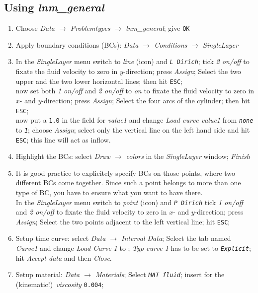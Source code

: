 \subsection{Using \emph{lnm\_general}}
\begin{enumerate}
\item Choose \emph{Data $\rightarrow$ Problemtypes $\rightarrow$ lnm\_general};
give \texttt{OK}
\item Apply boundary conditions (BCs): \emph{Data $\rightarrow$ Conditions
$\rightarrow$ SingleLayer}
\item In the \emph{SingleLayer} menu switch to \emph{line} (icon) and 
\texttt{\emph{L Dirich}}; 
tick \emph{2 on/off} to fixate the fluid velocity
to zero in $y$-direction; press \emph{Assign}; 
Select the two upper and the two lower horizontal lines; 
 then hit \texttt{ESC};\\
now set both \emph{1
on/off} and \emph{2 on/off} to \emph{on} to fixate the fluid velocity
to zero in $x$- and $y$-direction; press \emph{Assign}; 
Select the four arcs of the cylinder; 
 then hit \texttt{ESC};\\
now put a \texttt{1.0} in the field for \emph{value1} and change \emph{Load curve value1} from \emph{\texttt{none}} to \emph{\texttt{1}};
choose \emph{Assign}; select only the vertical line on the left hand side and hit
\texttt{ESC}; this line will act as inflow. 
\item Highlight the BCs: select \emph{Draw $\rightarrow$ colors} in the \emph{SingleLayer} window;
\emph{Finish}
\item It is good practice to explicitely specify BCs on those points, where two different BCs
come together. Since such a point belongs to more than one type of BC, you have to ensure what you want to have there.\\
In the \emph{SingleLayer} menu switch to \emph{point} (icon) and 
\texttt{\emph{P Dirich}} tick \emph{1
on/off} and \emph{2 on/off} to fixate the fluid velocity
to zero in $x$- and $y$-direction; press \emph{Assign}; 
Select the two points adjacent to the left vertical line; hit \texttt{ESC};
\item Setup time curve: select \emph{Data $\rightarrow$ Interval Data}; Select the tab named \emph{Curve1} and change \emph{Load Curve 1} to ; \emph{Typ curve 1} has to be set to \emph{\texttt{Explicit}}; hit \emph{Accept data} and then \emph{Close}.
\item Setup material: \emph{Data $\rightarrow$ Materials}; Select \texttt{\emph{MAT
fluid}}; insert for the (kinematic!)~\emph{viscosity} \texttt{0.004};

\end{enumerate}
